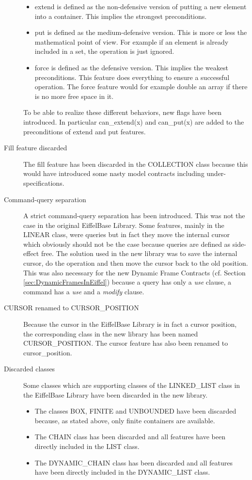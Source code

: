 \begin{description}
	\begin{itemize}
		\item extend is defined as the non-defensive version of putting a new element into a container. This implies the strongest preconditions.
		\item put is defined as the medium-defensive version. This is more or less the mathematical point of view. For example if an element is already included in a set, the operation is just ignored.
		\item force is defined as the defensive version. This implies the weakest preconditions. This feature does everything to ensure a successful operation. The force feature would for example double an array if there is no more free space in it.
	\end{itemize}
	To be able to realize these different behaviors, new flags have been introduced. In particular can\_extend(x) and can\_put(x) are added to the preconditions of extend and put features.
	\item [Fill feature discarded] The fill feature has been discarded in the COLLECTION class because this would have introduced some nasty model contracts including under-specifications.
	\item [Command-query separation] A strict command-query separation has been introduced. This was not the case in the original EiffelBase Library. Some features, mainly in the LINEAR class, were queries but in fact they move the internal cursor which obviously should not be the case because queries are defined as side-effect free. The solution used in the new library was to save the internal cursor, do the operation and then move the cursor back to the old position. This was also necessary for the new Dynamic Frame Contracts (cf. Section \ref{sec:DynamicFramesInEiffel}) because a query has only a \emph{use} clause, a command has a \emph{use} and a \emph{modify} clause.
	\item [CURSOR renamed to CURSOR\_POSITION] Because the cursor in the EiffelBase Library is in fact a cursor position, the corresponding class in the new library has been named CURSOR\_POSITION. The cursor feature has also been renamed to cursor\_position.
	\item [Discarded classes] Some classes which are supporting classes of the LINKED\_LIST class in the EiffelBase Library have been discarded in the new library.
	\begin{itemize}
		\item The classes BOX, FINITE and UNBOUNDED have been discarded because, as stated above, only finite containers are available.
		\item The CHAIN class has been discarded and all features have been directly included in the LIST class.
		\item The DYNAMIC\_CHAIN class has been discarded and all features have been directly included in the DYNAMIC\_LIST class.
	\end{itemize}
\end{description}

